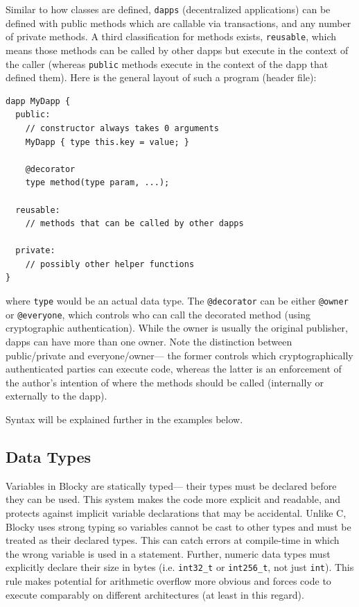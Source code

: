 \documentclass[letterpaper]{article}
\begin{document}
Similar to how classes are defined, \texttt{dapps} (decentralized applications) can be defined with public methods which are callable via transactions, and any number of private methods. A third classification for methods exists, \texttt{reusable}, which means those methods can be called by other dapps but execute in the context of the caller (whereas \texttt{public} methods execute in the context of the dapp that defined them). Here is the general layout of such a program (header file):
\begin{lstlisting}
dapp MyDapp {
  public:
    // constructor always takes 0 arguments
    MyDapp { type this.key = value; }
    
    @decorator
    type method(type param, ...);
    
  reusable:
    // methods that can be called by other dapps
    
  private:
    // possibly other helper functions
}
\end{lstlisting}
where \texttt{type} would be an actual data type. The \texttt{@decorator} can be either \texttt{@owner} or \texttt{@everyone}, which controls who can call the decorated method (using cryptographic authentication). While the owner is usually the original publisher, dapps can have more than one owner. Note the distinction between public/private and everyone/owner--- the former controls which cryptographically authenticated parties can execute code, whereas the latter is an enforcement of the author's intention of where the methods should be called (internally or externally to the dapp).

Syntax will be explained further in the examples below.

\subsection{Data Types}
Variables in Blocky are statically typed--- their types must be declared before they can be used. This system makes the code more explicit and readable, and protects against implicit variable declarations that may be accidental. Unlike C, Blocky uses strong typing so variables cannot be cast to other types and must be treated as their declared types. This can catch errors at compile-time in which the wrong variable is used in a statement. Further, numeric data types must explicitly declare their size in bytes (i.e. \texttt{int32\_t} or \texttt{int256\_t}, not just \texttt{int}). This rule makes potential for arithmetic overflow more obvious and forces code to execute comparably on different architectures (at least in this regard).
\end{document}
